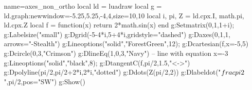 \begin{luadraw}{name=axes_non_ortho}
local ld = luadraw
local g = ld.graph:new{window={-5.25,5.25,-4,4},size={10,10}}
local i, pi, Z = ld.cpx.I, math.pi, ld.cpx.Z
local f = function(x) return 2*math.sin(x) end
g:Setmatrix({0,1,1+i}); g:Labelsize("small")
g:Dgrid({-5-4*i,5+4*i},{gridstyle="dashed"})
g:Daxes({0,1,1}, {arrows="-Stealth"})
g:Lineoptions("solid","ForestGreen",12); g:Dcartesian(f,{x={-5,5}})
g:Dcircle(0,3,"Crimson")
g:DlineEq(1,0,3,"Navy") -- line with equation x=-3
g:Lineoptions("solid","black",8); g:DtangentC(f,pi/2,1.5,"<->")
g:Dpolyline({pi/2,pi/2+2*i,2*i},"dotted")
g:Ddots(Z(pi/2,2))
g:Dlabeldot("$\\frac{\\pi}2$",pi/2,{pos="SW"})
g:Show()
\end{luadraw}
